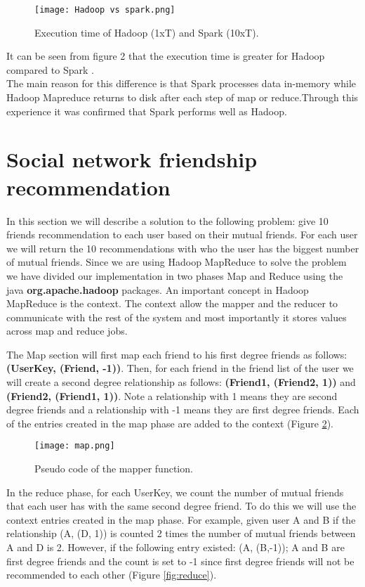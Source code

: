 \documentclass[12pt]{article}
\begin{document}
\begin{figure}[h]
  \centering
  \texttt{[image: Hadoop vs spark.png]}
  \caption{Execution time of Hadoop (1xT) and Spark (10xT).}
  \label{fig:hadoop vs spark}
\end{figure}
It can be seen from figure 2 that the execution time is greater for Hadoop compared to Spark .\\
The main reason for this difference is that Spark processes data in-memory while Hadoop Mapreduce returns to disk after each step of map or reduce.Through this experience it was confirmed that Spark performs well as Hadoop.
\section{Social network friendship recommendation}
In this section we will describe a solution to the following problem:
give 10 friends recommendation to each user based on their mutual friends.
For each user we will return the 10 recommendations with who the user has the biggest number of mutual friends. Since we are using Hadoop MapReduce to solve the problem we have divided our implementation in two phases Map and Reduce using the java \textbf{org.apache.hadoop} packages. An important concept in Hadoop MapReduce is the context. The context allow the mapper and the reducer to communicate with the rest of the system and most importantly it stores values across map and reduce jobs. 


The Map section will first map each friend to his first degree friends as follows: \textbf{(UserKey, (Friend, -1))}.
Then, for each friend in the friend list of the user we will create a second degree relationship as follows: \textbf{(Friend1, (Friend2, 1))} and \textbf{(Friend2, (Friend1, 1))}. Note a relationship with 1 means they are second degree friends and a relationship with -1 means they are first degree friends. Each of the entries created in the map phase are added to the context (Figure \ref{fig:map}).
\begin{figure}[h]
  \centering
  \texttt{[image: map.png]}
  \caption{Pseudo code of the mapper function.}
  \label{fig:map}
\end{figure}

In the reduce phase, for each UserKey, we count the number of mutual friends that each user has with the same second degree friend. To do this we will use the context entries created in the map phase. For example, given user A and B if the relationship (A, (D, 1)) is counted 2 times the number of mutual friends between A and D is 2. However, if the following entry existed: (A, (B,-1)); A and B are first degree friends and the count is set to -1 since first degree friends will not be recommended to each other (Figure \ref{fig:reduce}).
\end{document}
